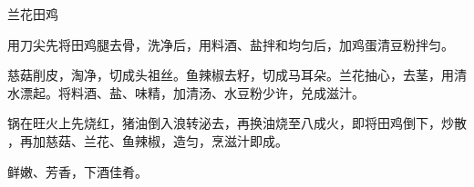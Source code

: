 \begin{recipe}{兰花田鸡}

\ingredients


\preparation

\step 用刀尖先将田鸡腿去骨，洗净后，用料酒、盐拌和均匀后，加鸡蛋清豆粉拌匀。

\step 慈菇削皮，淘净，切成头祖丝。鱼辣椒去籽，切成马耳朵。兰花抽心，去茎，用清
水漂起。将料酒、盐、味精，加清汤、水豆粉少许，兑成滋汁。

\step 锅在旺火上先烧红，猪油倒入浪转泌去，再换油烧至八成火，即将田鸡倒下，炒散
，再加慈菇、兰花、鱼辣椒，造匀，烹滋汁即成。

\features

鲜嫩、芳香，下酒佳肴。

\end{recipe}

